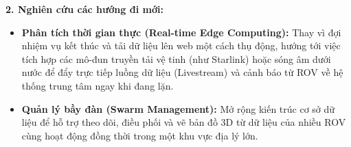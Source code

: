 \documentclass[../DoAn.tex]{subfiles}
\begin{document}
\textbf{2. Nghiên cứu các hướng đi mới:}
\begin{itemize}
    \item \textbf{Phân tích thời gian thực (Real-time Edge Computing):} Thay vì đợi nhiệm vụ kết thúc và tải dữ liệu lên web một cách thụ động, hướng tới việc tích hợp các mô-đun truyền tải vệ tinh (như Starlink) hoặc sóng âm dưới nước để đẩy trực tiếp luồng dữ liệu (Livestream) và cảnh báo từ ROV về hệ thống trung tâm ngay khi đang lặn.
    \item \textbf{Quản lý bầy đàn (Swarm Management):} Mở rộng kiến trúc cơ sở dữ liệu để hỗ trợ theo dõi, điều phối và vẽ bản đồ 3D từ dữ liệu của nhiều ROV cùng hoạt động đồng thời trong một khu vực địa lý lớn.
\end{itemize}
\end{document}
